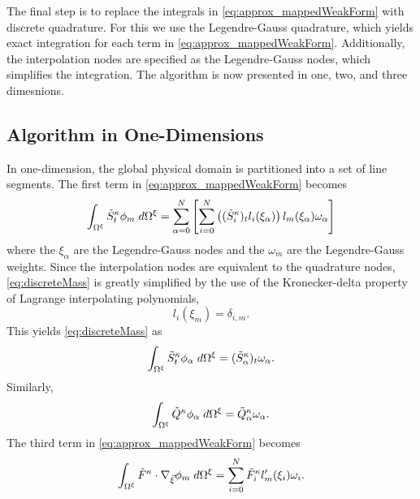 \documentclass{softwaremanual}
\begin{document}
The final step is to replace the integrals in \eqref{eq:approx_mappedWeakForm} with discrete quadrature. For this we use the Legendre-Gauss quadrature, which yields exact integration for each term in \eqref{eq:approx_mappedWeakForm}. Additionally, the interpolation nodes are specified as the Legendre-Gauss nodes, which simplifies the integration. The algorithm is now presented in one, two, and three dimesnions.

\subsection{Algorithm in One-Dimensions}\label{sec:DGSEM_1D}
In one-dimension, the global physical domain is partitioned into a set of line segments. The first term in \eqref{eq:approx_mappedWeakForm} becomes
\begin{equation}
\int_{\Omega^\xi} \tilde{S}^\kappa_t \phi_{m}  \hspace{1mm} d\Omega^\xi = \sum_{\alpha=0}^N\left[ \sum_{i=0}^N\left( (\tilde{S}^\kappa_{i})_tl_i(\xi_\alpha) \right)  l_m(\xi_\alpha) \omega_\alpha\right] \label{eq:discreteMass}
\end{equation}
where the $\xi_\alpha$ are the Legendre-Gauss nodes and the $\omega_m$ are the Legendre-Gauss weights. Since the interpolation nodes are equivalent to the quadrature nodes, \eqref{eq:discreteMass} is greatly simplified by the use of the Kronecker-delta property of Lagrange interpolating polynomials,
\begin{equation}
l_i(\xi_m) = \delta_{i,m}.
\end{equation}
This yields \eqref{eq:discreteMass} as
\begin{equation}
\int_{\Omega^\xi} \tilde{S}^\kappa_t \phi_{\alpha}  \hspace{1mm} d\Omega^\xi = (\tilde{S}^\kappa_{\alpha})_t \omega_\alpha.
\end{equation}
Similarly,
\begin{equation}
\int_{\Omega^\xi} \tilde{Q}^\kappa \phi_{\alpha}  \hspace{1mm} d\Omega^\xi = \tilde{Q}^\kappa_{\alpha} \omega_\alpha.
\end{equation}
The third term in \eqref{eq:approx_mappedWeakForm} becomes
\begin{equation}
\int_{\Omega^\xi} \tilde{F}^\kappa \cdot \nabla_{\vec{\xi}} \phi_{m}   \hspace{1mm} d\Omega^\xi = \sum_{i=0}^N  \tilde{F}^\kappa_i l'_m(\xi_i) \omega_i.
\end{equation}
\end{document}
